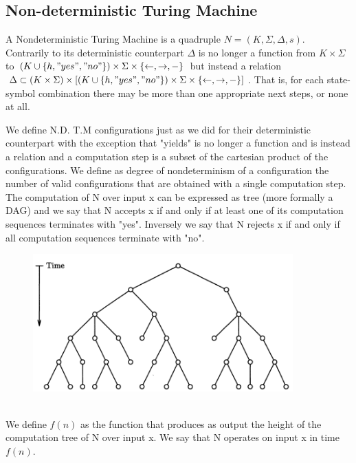 \subsection{Non-deterministic Turing Machine}
\begin{definition}
    A Nondeterministic Turing Machine is a quadruple $N = (K,\Sigma, \Delta,s)$.\\Contrarily to its deterministic counterpart $\Delta$ is no longer a function from $K\times \Sigma$ to $(K\cup\left\{ h,"yes","no" \right\})\times \Sigma \times \left\{ \leftarrow,\rightarrow,- \right\}$ but instead a relation $\Delta \subset (K\times \Sigma)\times \left[ (K\cup\left\{ h,"yes","no" \right\})\times \Sigma \times \left\{ \leftarrow,\rightarrow,- \right\} \right]$. That is, for each state-symbol combination there may be more than one appropriate next steps, or none at all. 
\end{definition}
We define N.D. T.M configurations just as we did for their deterministic counterpart with the exception that "yields" is no longer a function and is instead a relation and a computation step is a subset of the cartesian product of the configurations. We define as degree of nondeterminism of a configuration the number of valid configurations that are obtained with a single computation step.\\The computation of N over input x can be expressed as tree (more formally a DAG) and we say that N accepts x if and only if at least one of its computation sequences terminates with "yes". Inversely we say that N rejects x if and only if all computation sequences terminate with "no".
\begin{figure}[htbp]
    \centering
    \includegraphics[width=10cm]{Complexity/ndtm-computation-tree.png}
\end{figure}\\
We define $f(n)$ as the function that produces as output the height of the computation tree of N over input x. We say that N operates on input x in time $f(n)$. 
